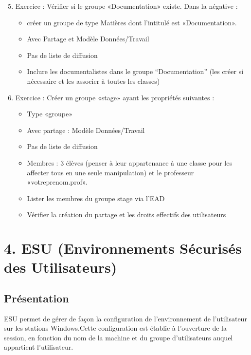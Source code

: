 \documentclass{article}
\begin{document}
\begin{enumerate}[(1)]
\setcounter{enumi}{4}
\item
  Exercice : Vérifier si le groupe «Documentation» existe. Dans la
  négative :
  \begin{itemize}
  \item
    créer un groupe de type Matières dont l'intitulé est
    «Documentation».
  \item
    Avec Partage et Modèle Données/Travail
  \item
    Pas de liste de diffusion
  \item
    Inclure les documentalistes dans le groupe ``Documentation'' (les
    créer si nécessaire et les associer à toutes les classes)
  \end{itemize}
\item
  Exercice : Créer un groupe «stage» ayant les propriétés suivantes :
  \begin{itemize}
  \item
    Type «groupe»
  \item
    Avec partage : Modèle Données/Travail
  \item
    Pas de liste de diffusion
  \item
    Membres : 3 élèves (penser à leur appartenance à une classe pour les
    affecter tous en une seule manipulation) et le professeur
    «votreprenom.prof».
  \item
    Lister les membres du groupe stage via l'EAD
  \item
    Vérifier la création du partage et les droits effectifs des
    utilisateurs
  \end{itemize}
\end{enumerate}
\section{4. ESU (Environnements Sécurisés des Utilisateurs)}

\subsection{Présentation}

ESU permet de gérer de façon la configuration de l'environnement de
l'utilisateur sur les stations Windows.Cette configuration est établie à
l'ouverture de la session, en fonction du nom de la machine et du groupe
d'utilisateurs auquel appartient l'utilisateur.
\end{document}
